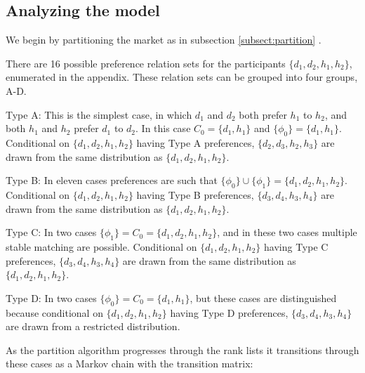 \documentclass[WP]{AEA}
\begin{document}
\subsection{Analyzing the model} \label{subsect:analysis}

We begin by partitioning the market as in subsection \ref{subsect:partition} . 

There are 16 possible preference relation sets for the participants $\{d_1,d_2,h_1,h_2\}$, enumerated in the appendix. These relation sets can be grouped into four groups, A-D.

Type A: This is the simplest case, in which $d_1$ and $d_2$ both prefer $h_1$ to $h_2$, and both $h_1$ and $h_2$ prefer $d_1$ to $d_2$.  In this case $C_0 =\{d_1,h_1\}$ and $\{\phi_0\}=\{d_1,h_1\}$. 
Conditional on $\{d_1,d_2,h_1,h_2\}$ having Type A preferences, $\{d_2,d_3,h_2,h_3\}$ are drawn from the same distribution as $\{d_1,d_2,h_1,h_2\}$.  

Type B: In eleven cases preferences are such that $ \{\phi_0\} \cup \{\phi_1\}=\{d_1,d_2,h_1,h_2\} $.
Conditional on $\{d_1,d_2,h_1,h_2\}$ having Type B preferences, $\{d_3,d_4,h_3,h_4\}$ are drawn from the same distribution as $\{d_1,d_2,h_1,h_2\}$.  

Type C: In two cases  $\{\phi_1\}=C_0 = \{d_1,d_2,h_1,h_2\}$, and in these two cases multiple stable matching are possible.  Conditional on $\{d_1,d_2,h_1,h_2\}$ having Type C preferences, $\{d_3,d_4,h_3,h_4\}$ are drawn from the same distribution as $\{d_1,d_2,h_1,h_2\}$.  

Type D: In two cases $\{\phi_0\}= C_0=\{d_1,h_1\}$, but these cases are distinguished because conditional on $\{d_1,d_2,h_1,h_2\}$ having Type D preferences, $\{d_3,d_4,h_3,h_4\}$ are drawn from  a restricted distribution.

As the partition algorithm progresses through the rank lists it transitions through these cases as a Markov chain with the transition matrix:
\end{document}
